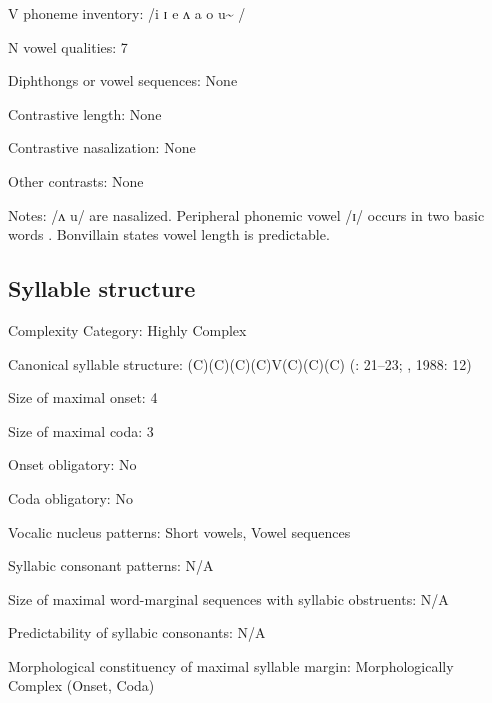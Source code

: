 {\begin{appendixdesc}
\item[V phoneme inventory:] /i ɪ e ʌ a o u\~{} /

\item[N vowel qualities:] 7

\item[Diphthongs or vowel sequences:] None

\item[Contrastive length:] None

\item[Contrastive nasalization:] None

\item[Other contrasts:] None

\item[Notes:] /ʌ u/ are nasalized. Peripheral phonemic vowel /ɪ/ occurs in two basic words \citep[43]{Bonvillain1973}. Bonvillain states vowel length is predictable.
\end{appendixdesc}
\subsection*{Syllable structure}
\begin{appendixdesc}

\item[Complexity Category:] Highly Complex

\item[Canonical syllable structure:] (C)(C)(C)(C)V(C)(C)(C) (\citealt{Bonvillain1973}: 21--23; \citealt{Michelson1981}, 1988: 12)

\item[Size of maximal onset:] 4

\item[Size of maximal coda:] 3

\item[Onset obligatory:] No

\item[Coda obligatory:] No

\item[Vocalic nucleus patterns:] Short vowels, Vowel sequences

\item[Syllabic consonant patterns:] N/A

\item[Size of maximal word-marginal sequences with syllabic obstruents:] N/A

\item[Predictability of syllabic consonants:] N/A

\item[Morphological constituency of maximal syllable margin:] Morphologically Complex (Onset, Coda)


\end{appendixdesc}}
